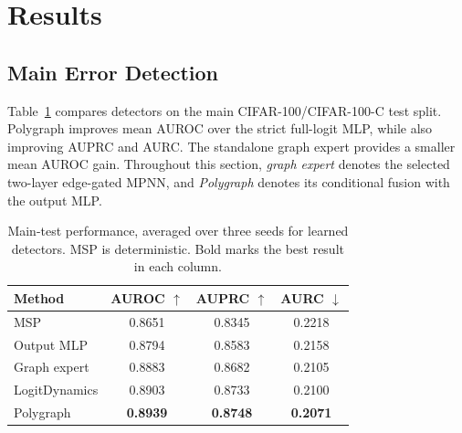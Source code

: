 \documentclass[11pt]{article}
\begin{document}


\newcommand{\pgscore}[2]{%
  \begingroup
  \renewcommand{\arraystretch}{0.85}%
  \begin{tabular}[c]{@{}c@{}}%
    #1\\
    {\scriptsize\(\pm\,#2\)}%
  \end{tabular}%
  \endgroup
}

\section{Results}

\subsection{Main Error Detection}
Table~\ref{tab:results_main} compares detectors on the main
CIFAR-100/CIFAR-100-C test split. Polygraph improves mean AUROC over
the strict full-logit MLP, while also improving AUPRC and
AURC. The standalone graph expert provides a smaller mean AUROC
gain. Throughout this section, \emph{graph expert} denotes
the selected two-layer edge-gated MPNN, and \emph{Polygraph} denotes
its conditional fusion with the output MLP.

\begin{table}[!htbp]
  \centering
  \small
  \setlength{\tabcolsep}{3pt}
  \renewcommand{\arraystretch}{1.08}
  \begin{tabularx}{\columnwidth}{@{}>{\raggedright\arraybackslash}Xccc@{}}
    \toprule
    Method & AUROC $\uparrow$ & AUPRC $\uparrow$ & AURC $\downarrow$ \\
    \midrule
    MSP          & 0.8651          & 0.8345          & 0.2218 \\
    Output MLP   & 0.8794          & 0.8583          & 0.2158 \\
    Graph expert & 0.8883          & 0.8682          & 0.2105 \\
    LogitDynamics & 0.8903         & 0.8733          & 0.2100 \\
    Polygraph    & \textbf{0.8939} & \textbf{0.8748} & \textbf{0.2071} \\
    \bottomrule
  \end{tabularx}
  \caption{Main-test performance, averaged over three seeds for
  learned detectors. MSP is deterministic. Bold marks the best
  result in each column.}
  \label{tab:results_main}
\end{table}
\end{document}
